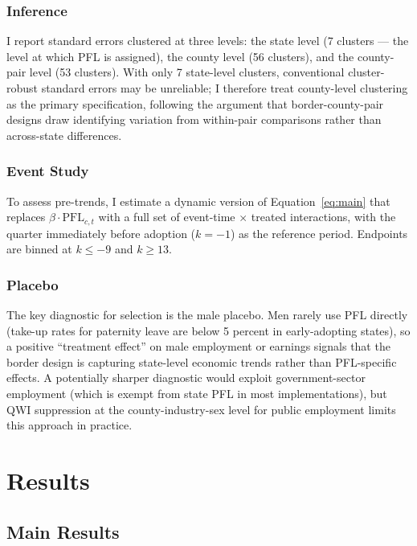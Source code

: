 \documentclass[12pt]{article}
\begin{document}
\subsubsection*{Inference} I report standard errors clustered at three levels: the state level (7 clusters --- the level at which PFL is assigned), the county level (56 clusters), and the county-pair level (53 clusters). With only 7 state-level clusters, conventional cluster-robust standard errors may be unreliable; I therefore treat county-level clustering as the primary specification, following the argument that border-county-pair designs draw identifying variation from within-pair comparisons rather than across-state differences.

\subsubsection*{Event Study} To assess pre-trends, I estimate a dynamic version of Equation~\ref{eq:main} that replaces $\beta \cdot \text{PFL}_{c,t}$ with a full set of event-time $\times$ treated interactions, with the quarter immediately before adoption ($k = -1$) as the reference period. Endpoints are binned at $k \leq -9$ and $k \geq 13$.

\subsubsection*{Placebo} The key diagnostic for selection is the male placebo. Men rarely use PFL directly (take-up rates for paternity leave are below 5 percent in early-adopting states), so a positive ``treatment effect'' on male employment or earnings signals that the border design is capturing state-level economic trends rather than PFL-specific effects. A potentially sharper diagnostic would exploit government-sector employment (which is exempt from state PFL in most implementations), but QWI suppression at the county-industry-sex level for public employment limits this approach in practice.


\section{Results}

\subsection{Main Results}


\end{document}
